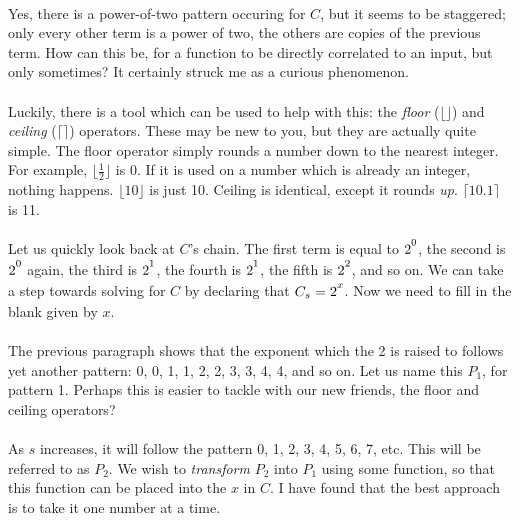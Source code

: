\documentclass[12pt,letterpaper]{article}
\begin{document}
			\paragraph{} Yes, there is a power-of-two pattern occuring for $C$, but it seems to be staggered; only every other term is a power of two, the others are copies of the previous term. How can this be, for a function to be directly correlated to an input, but only sometimes? It certainly struck me as a curious phenomenon.
			
			\paragraph{} Luckily, there is a tool which can be used to help with this: the \textit{floor} ($\lfloor \rfloor$) and \textit{ceiling} ($\lceil \rceil$) operators. These may be new to you, but they are actually quite simple. The floor operator simply rounds a number down to the nearest integer. For example, $\lfloor \frac{1}{2} \rfloor$ is 0. If it is used on a number which is already an integer, nothing happens. $\lfloor 10 \rfloor$ is just 10. Ceiling is identical, except it rounds \textit{up}. $\lceil 10.1 \rceil$ is 11.
			
			\paragraph{} Let us quickly look back at $C$'s chain. The first term is equal to $2\strut^0$, the second is $2\strut^0$ again, the third is $2\strut^1$, the fourth is $2\strut^1$, the fifth is $2\strut^2$, and so on. We can take a step towards solving for $C$ by declaring that $C_s = 2\strut^x$. Now we need to fill in the blank given by $x$.
			
			\paragraph{} The previous paragraph shows that the exponent which the 2 is raised to follows yet another pattern: 0, 0, 1, 1, 2, 2, 3, 3, 4, 4, and so on. Let us name this $P_1$, for pattern 1. Perhaps this is easier to tackle with our new friends, the floor and ceiling operators?
			
			\paragraph{} As $s$ increases, it will follow the pattern 0, 1, 2, 3, 4, 5, 6, 7, etc. This will be referred to as $P_2$. We wish to \textit{transform} $P_2$ into $P_1$ using some function, so that this function can be placed into the $x$ in $C$. I have found that the best approach is to take it one number at a time.
			
\end{document}

